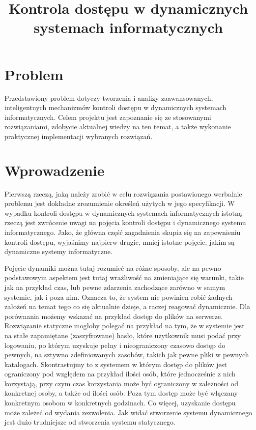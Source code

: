 \documentclass{classrep}
\author{%
  \studentinfo{Mateusz Grotek}{186816} \and
  \studentinfo{Mateusz Jakóbczak}{186819} \and
  \studentinfo{Rafał Jurkiewicz}{186822} \and
  \studentinfo{Łukasz Kotyński}{186829} \and
  \studentinfo{Paweł Tarasiuk}{186875}
}
\title{Kontrola dostępu w dynamicznych systemach informatycznych}
\begin{document}
\maketitle

\section{Problem}
Przedstawiony problem dotyczy tworzenia i analizy zaawansowanych, inteligentnych mechanizmów kontroli dostępu w dynamicznych systemach informatycznych. Celem projektu jest
zapoznanie się ze stosowanymi rozwiązaniami, zdobycie aktualnej wiedzy na ten temat, a także wykonanie praktycznej implementacji wybranych rozwiązań.
\section{Wprowadzenie}
Pierwszą rzeczą, jaką należy zrobić w celu rozwiązania postawionego werbalnie problemu jest dokładne zrozumienie określeń użytych w jego specyfikacji. W wypadku
kontroli dostępu w dynamicznych systemach informatycznych istotną rzeczą jest zwrócenie uwagi na pojęcia kontroli dostępu i dynamicznego systemu informatycznego. Jako, że główna
część zagadnienia skupia się na zapewnieniu kontroli dostępu, wyjaśnimy najpierw drugie, mniej istotne pojęcie, jakim są dynamiczne systemy informatyczne.

Pojęcie dynamiki można tutaj
rozumieć na różne sposoby, ale na pewno podstawowym aspektem jest tutaj wrażliwość na zmieniające się warunki, takie jak na przykład czas, lub pewne zdarzenia zachodzące zarówno 
w samym systemie, jak i poza nim. Oznacza to, że system nie powinien robić żadnych założeń na temat tego co się aktualnie dzieje, a raczej reagować dynamicznie. Dla porównania
możemy wskazać na przykład dostęp do plików na serwerze. Rozwiązanie statyczne mogłoby polegać na przykład na tym, że w systemie jest na stałe zapamiętane (zaszyfrowane) hasło,
które użytkownik musi podać przy logowaniu, po którym uzyskuje pełny i nieograniczony czasowo dostęp do pewnych, na sztywno zdefiniowanych zasobów, takich jak pewne pliki w pewnych katalogach.
Skontrastujmy to z systemem w którym dostęp do plików jest ograniczony pod względem na przykład ilości osób, które jednocześnie z nich korzystają, przy czym czas korzystania może być ograniczony
w zależności od konkretnej osoby, a także od ilości osób. Poza tym dostęp może być włączany konkretnym osobom w konkretnych godzinach. Co więcej, uzyskanie dostępu może zależeć od
wydania zezwolenia. Jak widać stworzenie systemu dynamicznego jest dużo trudniejsze od stworzenia systemu statycznego.
\end{document}
